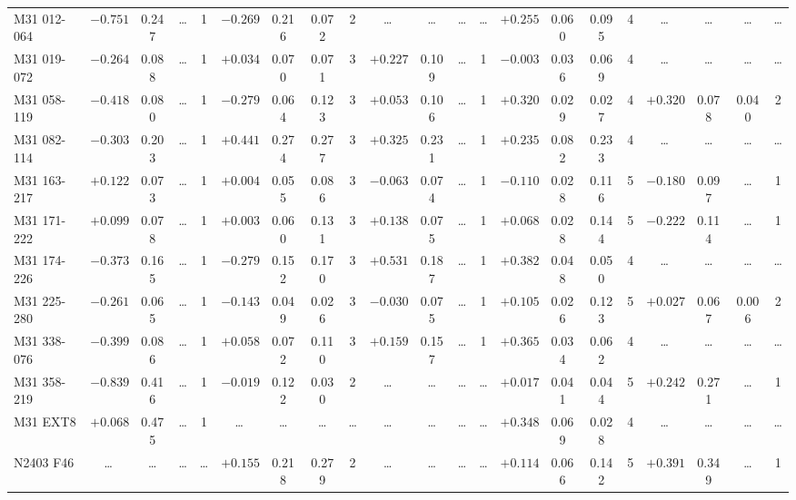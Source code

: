 \documentclass{aa}
\begin{document}
\begin{appendix}
\begin{table*}
\begin{adjustbox}{width=1\textwidth}
{\begin{tabular}{l cccccccccccccccccccc}
M31 012-064   & $-0.751$ & 0.247 & \ldots & 1 & $-0.269$ & 0.216 & 0.072 & 2 & \ldots & \ldots & \ldots & \ldots & $+0.255$ & 0.060 & 0.095 & 4 & \ldots & \ldots & \ldots & \ldots \\
M31 019-072   & $-0.264$ & 0.088 & \ldots & 1 & $+0.034$ & 0.070 & 0.071 & 3 & $+0.227$ & 0.109 & \ldots & 1 & $-0.003$ & 0.036 & 0.069 & 4 & \ldots & \ldots & \ldots & \ldots \\
M31 058-119   & $-0.418$ & 0.080 & \ldots & 1 & $-0.279$ & 0.064 & 0.123 & 3 & $+0.053$ & 0.106 & \ldots & 1 & $+0.320$ & 0.029 & 0.027 & 4 & $+0.320$ & 0.078 & 0.040 & 2 \\
M31 082-114   & $-0.303$ & 0.203 & \ldots & 1 & $+0.441$ & 0.274 & 0.277 & 3 & $+0.325$ & 0.231 & \ldots & 1 & $+0.235$ & 0.082 & 0.233 & 4 & \ldots & \ldots & \ldots & \ldots \\
M31 163-217   & $+0.122$ & 0.073 & \ldots & 1 & $+0.004$ & 0.055 & 0.086 & 3 & $-0.063$ & 0.074 & \ldots & 1 & $-0.110$ & 0.028 & 0.116 & 5 & $-0.180$ & 0.097 & \ldots & 1 \\
M31 171-222   & $+0.099$ & 0.078 & \ldots & 1 & $+0.003$ & 0.060 & 0.131 & 3 & $+0.138$ & 0.075 & \ldots & 1 & $+0.068$ & 0.028 & 0.144 & 5 & $-0.222$ & 0.114 & \ldots & 1 \\
M31 174-226   & $-0.373$ & 0.165 & \ldots & 1 & $-0.279$ & 0.152 & 0.170 & 3 & $+0.531$ & 0.187 & \ldots & 1 & $+0.382$ & 0.048 & 0.050 & 4 & \ldots & \ldots & \ldots & \ldots \\
M31 225-280   & $-0.261$ & 0.065 & \ldots & 1 & $-0.143$ & 0.049 & 0.026 & 3 & $-0.030$ & 0.075 & \ldots & 1 & $+0.105$ & 0.026 & 0.123 & 5 & $+0.027$ & 0.067 & 0.006 & 2 \\
M31 338-076   & $-0.399$ & 0.086 & \ldots & 1 & $+0.058$ & 0.072 & 0.110 & 3 & $+0.159$ & 0.157 & \ldots & 1 & $+0.365$ & 0.034 & 0.062 & 4 & \ldots & \ldots & \ldots & \ldots \\
M31 358-219   & $-0.839$ & 0.416 & \ldots & 1 & $-0.019$ & 0.122 & 0.030 & 2 & \ldots & \ldots & \ldots & \ldots & $+0.017$ & 0.041 & 0.044 & 5 & $+0.242$ & 0.271 & \ldots & 1 \\
M31 EXT8      & $+0.068$ & 0.475 & \ldots & 1 & \ldots & \ldots & \ldots & \ldots & \ldots & \ldots & \ldots & \ldots & $+0.348$ & 0.069 & 0.028 & 4 & \ldots & \ldots & \ldots & \ldots \\
N2403 F46     & \ldots & \ldots & \ldots & \ldots & $+0.155$ & 0.218 & 0.279 & 2 & \ldots & \ldots & \ldots & \ldots & $+0.114$ & 0.066 & 0.142 & 5 & $+0.391$ & 0.349 & \ldots & 1 \\
\hline
\end{tabular}
}
\end{adjustbox}
\end{table*}


\end{appendix}
\end{document}
